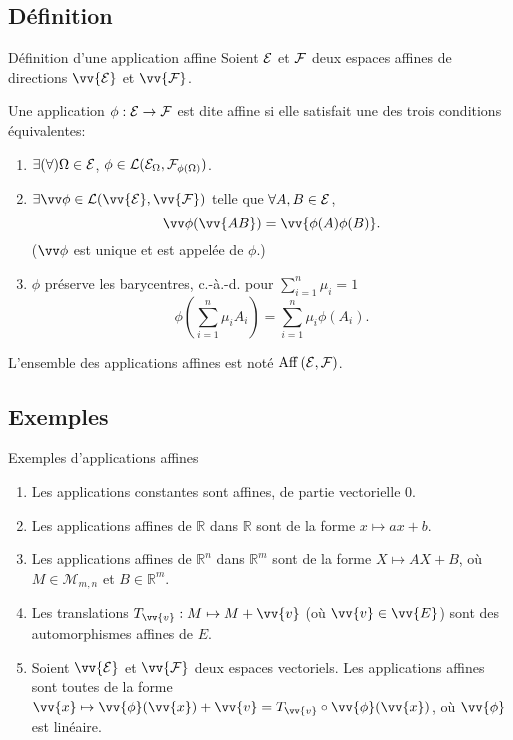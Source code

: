 \documentclass[
bigger]{m53beamer}
\begin{document}
\subsection{Définition}
  \begin{frame}{Définition d'une application affine}
    Soient $\mathcal{E}$ et $\mathcal{F}$ deux espaces affines de directions $\vv{\ens{E}}$ et $\vv{\ens{F}}$.
    \begin{defprop}
      Une application $\phi:\mathcal{E}\rightarrow\mathcal{F}$ est dite \alert{affine} si elle satisfait une des trois conditions équivalentes:
      \begin{enumerate}[<+(1)->]
        \item $\exists(\forall) \Omega \in \mathcal{E}$, $\phi\in\mathcal{L}(\mathcal{E}_{\Omega},\mathcal{F}_{\phi(\Omega)})$.
        \item $\exists \vv\phi \in \mathcal{L}(\vv{\ens{E}},\vv{\ens{F}})$ telle que $\forall A,B \in \mathcal{E}$,
          $$
            \vv\phi(\vv{AB})=\vv{\phi(A)\phi(B)}.
          $$
        ($\vv\phi$ est unique et est appelée  de $\phi$.)
        \item $\phi$ préserve les barycentres, c.-à.-d. pour $\sum_{i=1}^{n}\mu_{i}=1$
          $$
            \phi(\sum_{i=1}^{n}\mu_{i}A_{i})=\sum_{i=1}^{n}\mu_{i}\phi(A_{i}).
          $$
      \end{enumerate}\pause
      L'ensemble des applications affines est noté $\operatorname{Aff}\left(\mathcal{E},\mathcal{F}\right)$.
    \end{defprop}
  \end{frame}
\subsection{Exemples}
  \begin{frame}{Exemples d'applications affines}
    \begin{enumerate}[<+(1)->]
      \item Les applications constantes sont affines, de partie vectorielle $0$.
      \item Les applications affines de $\mathbb{R}$ dans $\mathbb{R}$ sont de la forme $x \mapsto ax+b$.
      \item Les applications affines de $\mathbb{R}^{n}$ dans $\mathbb{R}^{m}$ sont de la forme $X \mapsto AX+B$, où $M \in \mathcal{M}_{m,n}$ et $B \in \mathbb{R}^{m}$.
      \item Les translations $T_{\vv{v}}:M \mapsto M+\vv{v}$ (où $\vv{v} \in \vv{E}$) sont des automorphismes affines de $E$.
      \item Soient $\vv{\mathcal{E}}$ et $\vv{\mathcal{F}}$ deux espaces vectoriels. Les applications affines sont toutes de la forme $\vv{x} \mapsto \vv{\phi}(\vv{x}) + \vv{v}=T_{\vv{v}}\circ\vv{\phi}(\vv{x})$, où $\vv{\phi}$ est linéaire.
    \end{enumerate}
  \end{frame}
\end{document}

